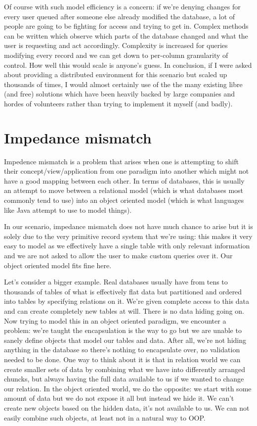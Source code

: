 \documentclass{report}
\begin{document}
Of course with such model efficiency is a concern: if we're denying
changes for every user queued after someone else already modified the
database, a lot of people are going to be fighting for access and
trying to get in. Complex methods can be written which observe which
parts of the database changed and what the user is requesting and act
accordingly. Complexity is increased for queries modifying every
record and we can get down to per-column granularity of control. How
well this would scale is anyone's guess. In conclusion, if I were
asked about providing a distributed environment for this scenario but
scaled up thousands of times, I would almost certainly use of the the
many existing libre (and free) solutions which have been heavily
backed by large companies and hordes of volunteers rather than trying
to implement it myself (and badly).

\section*{Impedance mismatch}
Impedence mismatch is a problem that arises when one is attempting to
shift their concept/view/application from one paradigm into another
which might not have a good mapping between each other. In terms of
databases, this is usually an attempt to move between a relational
model (which is what databases most commonly tend to use) into an
object oriented model (which is what languages like Java attempt to
use to model things).

In our scenario, impedance mismatch does not have much chance to arise
but it is solely due to the very primitive record system that we're
using: this makes it very easy to model as we effectively have a
single table with only relevant information and we are not asked to
allow the user to make custom queries over it. Our object oriented
model fits fine here.

Let's consider a bigger example. Real databases usually have from tens
to thousands of tables of what is effectively flat data but
partitioned and ordered into tables by specifying relations on it.
We're given complete access to this data and can create completely new
tables at will. There is no data hiding going on. Now trying to model
this in an object oriented paradigm, we encounter a problem: we're
taught the encapsulation is the way to go but we are unable to sanely
define objects that model our tables and data. After all, we're not
hiding anything in the database so there's nothing to encapsulate
over, no validation needed to be done. One way to think about it is
that in relation world we can create smaller sets of data by combining
what we have into differently arranged chuncks, but always having the
full data available to us if we wanted to change our relation. In the
object oriented world, we do the opposite: we start with some amount
of data but we do not expose it all but instead we hide it. We can't
create new objects based on the hidden data, it's not available to us.
We can not easily combine such objects, at least not in a natural way
to OOP.
\end{document}
